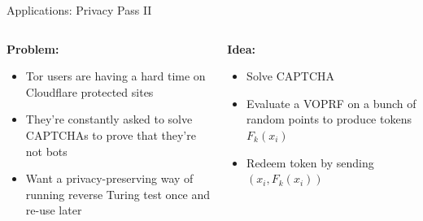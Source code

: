 \documentclass[xcolor=table,10pt,aspectratio=169]{beamer}
\begin{document}
\begin{frame}[label={sec:orga86bd12}]{Applications: Privacy Pass II}
\begin{columns}[t]
\begin{column}{0.6\columnwidth}
\textbf{Problem:}

\begin{itemize}
\item Tor users are having a hard time on Cloudflare protected sites
\item They’re constantly asked to solve CAPTCHAs to prove that they’re not bots
\item Want a privacy-preserving way of running reverse Turing test once and re-use later
\end{itemize}
\end{column}

\begin{column}{0.4\columnwidth}
\textbf{Idea:}

\begin{itemize}
\item Solve CAPTCHA
\item Evaluate a VOPRF on a bunch of random points to produce tokens \(F_k(x_i)\)
\item Redeem token by sending \((x_i, F_k(x_i))\)
\end{itemize}
\end{column}
\end{columns}

\vspace{1em}

\footnotesize
{}
\end{frame}
\end{document}

